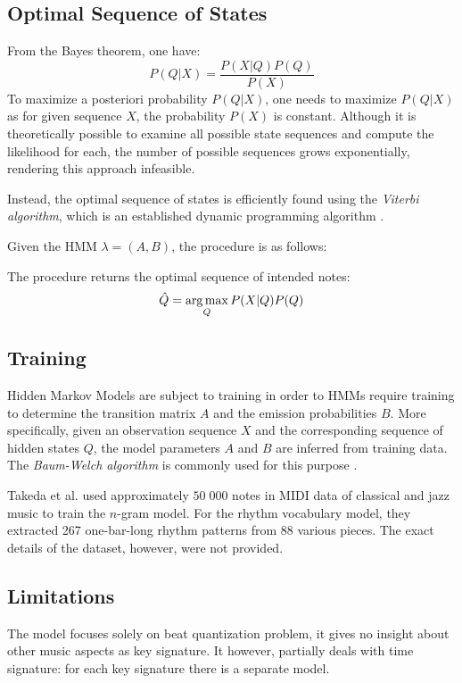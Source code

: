\subsection{Optimal Sequence of States}

From the Bayes theorem, one have: \[P(Q|X)=\frac{P(X|Q)P(Q)}{P(X)}\] To maximize a posteriori probability $P(Q|X)$, one needs to maximize $P(Q|X)$ as for given sequence $X$, the probability $P(X)$ is constant. Although it is theoretically possible to examine all possible state sequences and compute the likelihood for each, the number of possible sequences grows exponentially, rendering this approach infeasible.

Instead, the optimal sequence of states is efficiently found using the \emph{Viterbi algorithm}, which is an established dynamic programming algorithm  \cite[p.210--220]{Jurafsky2009}. 

Given the HMM $\lambda = (A, B)$, the procedure is as follows:



The procedure returns the optimal sequence of intended notes: \[\hat{Q} = \argmax_Q P(X|Q)P(Q)\]

\subsection{Training}

Hidden Markov Models are subject to training in order to HMMs require training to determine the transition matrix $A$ and the emission probabilities $B$. More specifically, given an observation sequence $X$ and the corresponding sequence of hidden states $Q$, the model parameters $A$ and $B$ are inferred from training data. The \emph{Baum-Welch algorithm} is commonly used for this purpose \cite[p. 220--226]{Jurafsky2009}.

Takeda et al. used approximately $50\;000$ notes in MIDI data of classical and jazz music to train the $n$-gram model. For the rhythm vocabulary model, they extracted 267 one-bar-long rhythm patterns from 88 various pieces. The exact details of the dataset, however, were not provided.

\subsection{Limitations}

The model focuses solely on beat quantization problem, it gives no insight about other music aspects as key signature. It however, partially deals with time signature: for each key signature there is a separate model.

